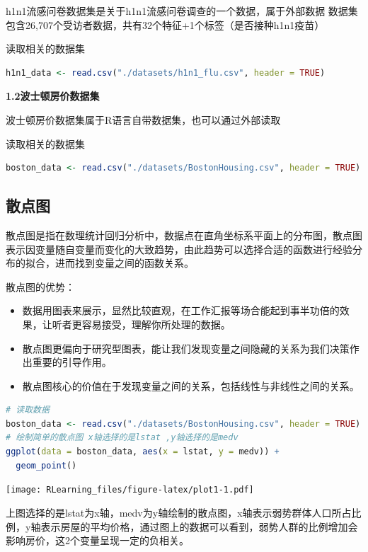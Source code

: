\documentclass[]{ctexbook}
\providecommand{\tightlist}{%
  \setlength{\itemsep}{0pt}\setlength{\parskip}{0pt}}
\begin{document}
h1n1流感问卷数据集是关于h1n1流感问卷调查的一个数据，属于外部数据
数据集包含26,707个受访者数据，共有32个特征+1个标签（是否接种h1n1疫苗）

读取相关的数据集

\begin{lstlisting}[language=R]
h1n1_data <- read.csv("./datasets/h1n1_flu.csv", header = TRUE)
\end{lstlisting}

\textbf{1.2波士顿房价数据集}

波士顿房价数据集属于R语言自带数据集，也可以通过外部读取

读取相关的数据集

\begin{lstlisting}[language=R]
boston_data <- read.csv("./datasets/BostonHousing.csv", header = TRUE)
\end{lstlisting}

\hypertarget{ux6563ux70b9ux56fe}{%
\subsection{散点图}\label{ux6563ux70b9ux56fe}}

散点图是指在数理统计回归分析中，数据点在直角坐标系平面上的分布图，散点图表示因变量随自变量而变化的大致趋势，由此趋势可以选择合适的函数进行经验分布的拟合，进而找到变量之间的函数关系。

散点图的优势：

\begin{itemize}
\tightlist
\item
  数据用图表来展示，显然比较直观，在工作汇报等场合能起到事半功倍的效果，让听者更容易接受，理解你所处理的数据。
\item
  散点图更偏向于研究型图表，能让我们发现变量之间隐藏的关系为我们决策作出重要的引导作用。
\item
  散点图核心的价值在于发现变量之间的关系，包括线性与非线性之间的关系。
\end{itemize}

\begin{lstlisting}[language=R]
# 读取数据
boston_data <- read.csv("./datasets/BostonHousing.csv", header = TRUE)
# 绘制简单的散点图 x轴选择的是lstat ,y轴选择的是medv
ggplot(data = boston_data, aes(x = lstat, y = medv)) +
  geom_point()
\end{lstlisting}

\texttt{[image: RLearning\_files/figure-latex/plot1-1.pdf]}

上图选择的是lstat为x轴，medv为y轴绘制的散点图，x轴表示弱势群体人口所占比例，y轴表示房屋的平均价格，通过图上的数据可以看到，弱势人群的比例增加会影响房价，这2个变量呈现一定的负相关。
\end{document}
